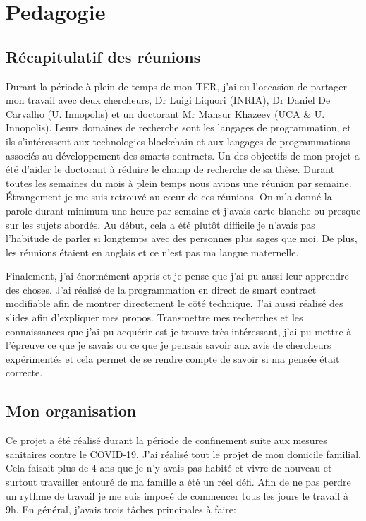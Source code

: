 \section{Pedagogie}

\subsection{Récapitulatif des réunions}

Durant la période à plein de temps de mon TER, j'ai eu l'occasion de partager mon travail avec deux chercheurs, 
Dr Luigi Liquori (INRIA), Dr Daniel De Carvalho (U. Innopolis) et un doctorant Mr Mansur Khazeev (UCA \& U. Innopolis).
Leurs domaines de recherche sont les langages de programmation, et ils s'intéressent aux technologies blockchain et
aux langages de programmations associés au développement des smarts contracts.
Un des objectifs de mon projet a été d'aider le doctorant à réduire le champ de recherche de sa thèse. Durant toutes
les semaines du mois à plein temps nous avions une réunion par semaine. Étrangement je me suis retrouvé au cœur de 
ces réunions. On m'a donné la parole durant minimum une heure par semaine et j'avais carte blanche ou presque
sur les sujets abordés.  Au début, cela a été plutôt difficile je n'avais pas l'habitude de parler si longtemps avec
des personnes plus sages que moi. De plus, les réunions étaient en anglais et ce n'est pas ma langue maternelle.

Finalement, j'ai énormément appris et je pense que j'ai pu aussi leur apprendre des choses. J'ai réalisé de la programmation
en direct de smart contract modifiable afin de montrer directement le côté technique. J'ai aussi réalisé des slides afin d'expliquer mes propos. Transmettre mes recherches et les connaissances que j'ai pu acquérir est je trouve
très intéressant, j'ai pu mettre à l'épreuve ce que je savais ou ce que je pensais savoir aux avis de chercheurs expérimentés
et cela permet de se rendre compte de savoir si ma pensée était correcte.

\subsection{Mon organisation}

Ce projet a été réalisé durant la période de confinement suite aux mesures sanitaires contre le COVID-19. J'ai réalisé
tout le projet de mon domicile familial. Cela faisait plus de 4 ans que je n'y avais pas habité et vivre de nouveau
et surtout travailler entouré de ma famille a été un réel défi. Afin de ne pas perdre un rythme de travail je me suis imposé
de commencer tous les jours le travail à 9h. En général, j'avais trois tâches principales à faire:


